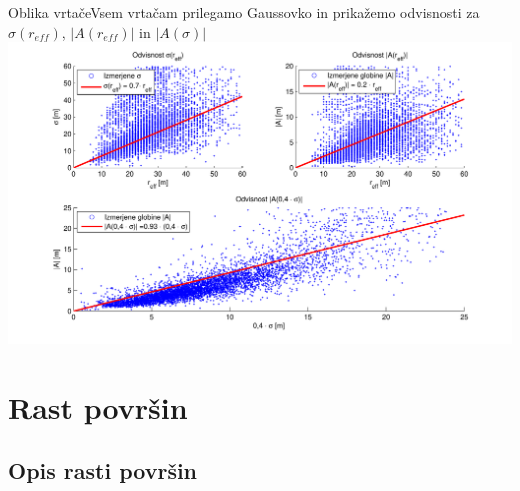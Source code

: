 \documentclass{beamer}
\begin{document}
\begin{frame}{Oblika vrtače}{Vsem vrtačam prilegamo Gaussovko in prikažemo odvisnosti za $\sigma(r_{eff})$, $|A(r_{eff})|$ in $|A(\sigma)|$}
    \hspace*{-0.1\textwidth}\includegraphics[width=1.2\textwidth]{slike/menisija-A-sigma-reff}
\end{frame}

\section{Rast površin}

\subsection{Opis rasti površin}
\end{document}
